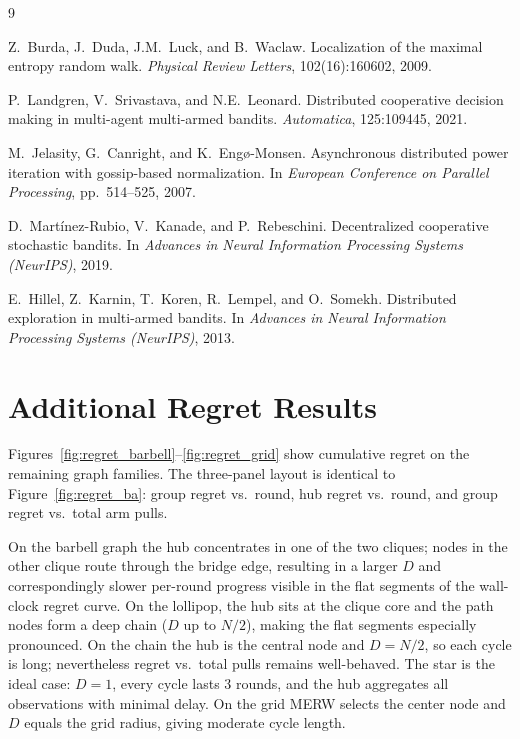 \documentclass{article}
\begin{document}

\begin{thebibliography}{9}

Z.~Burda, J.~Duda, J.M.~Luck, and B.~Waclaw.
\newblock Localization of the maximal entropy random walk.
\newblock \emph{Physical Review Letters}, 102(16):160602, 2009.

P.~Landgren, V.~Srivastava, and N.E.~Leonard.
\newblock Distributed cooperative decision making in multi-agent multi-armed bandits.
\newblock \emph{Automatica}, 125:109445, 2021.

M.~Jelasity, G.~Canright, and K.~Eng\o-Monsen.
\newblock Asynchronous distributed power iteration with gossip-based normalization.
\newblock In \emph{European Conference on Parallel Processing}, pp.~514--525, 2007.

D.~Mart\'inez-Rubio, V.~Kanade, and P.~Rebeschini.
\newblock Decentralized cooperative stochastic bandits.
\newblock In \emph{Advances in Neural Information Processing Systems (NeurIPS)}, 2019.

E.~Hillel, Z.~Karnin, T.~Koren, R.~Lempel, and O.~Somekh.
\newblock Distributed exploration in multi-armed bandits.
\newblock In \emph{Advances in Neural Information Processing Systems (NeurIPS)}, 2013.

\end{thebibliography}

\section{Additional Regret Results}
\label{app:regret}

Figures~\ref{fig:regret_barbell}--\ref{fig:regret_grid} show cumulative regret on the remaining graph families. The three-panel layout is identical to Figure~\ref{fig:regret_ba}: group regret vs.\ round, hub regret vs.\ round, and group regret vs.\ total arm pulls.

On the barbell graph the hub concentrates in one of the two cliques; nodes in the other clique route through the bridge edge, resulting in a larger $D$ and correspondingly slower per-round progress visible in the flat segments of the wall-clock regret curve. On the lollipop, the hub sits at the clique core and the path nodes form a deep chain ($D$ up to $N/2$), making the flat segments especially pronounced. On the chain the hub is the central node and $D = N/2$, so each cycle is long; nevertheless regret vs.\ total pulls remains well-behaved. The star is the ideal case: $D=1$, every cycle lasts 3 rounds, and the hub aggregates all observations with minimal delay. On the grid MERW selects the center node and $D$ equals the grid radius, giving moderate cycle length.
\end{document}
